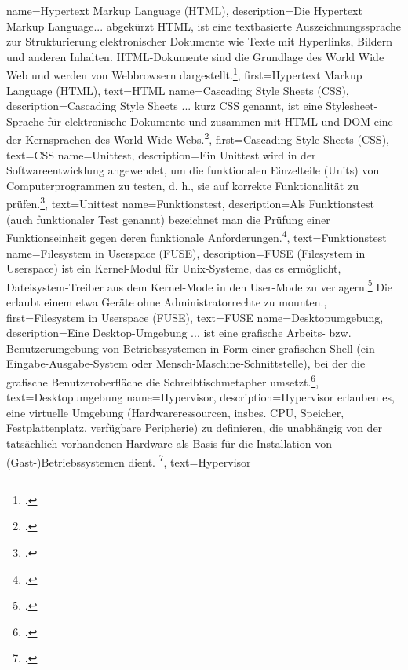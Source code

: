 {
    name={Hypertext Markup Language (HTML)},
    description={Die Hypertext Markup Language... abgekürzt HTML, ist eine textbasierte
      Auszeichnungssprache zur Strukturierung elektronischer Dokumente wie Texte mit
      Hyperlinks, Bildern und anderen Inhalten. HTML-Dokumente sind die Grundlage des
      World Wide Web und werden von Webbrowsern dargestellt.\footcite{html}},
    first={Hypertext Markup Language (HTML)},
    text={HTML}
}
{
    name={Cascading Style Sheets (CSS)},
    description={Cascading Style Sheets ... kurz CSS genannt, ist
      eine Stylesheet-Sprache für elektronische Dokumente und zusammen mit HTML und
      DOM eine der Kernsprachen des World Wide Webs.\footcite{css}},
    first={Cascading Style Sheets (CSS)},
    text={CSS}
}
{
    name={Unittest},
    description={Ein Unittest wird in der Softwareentwicklung angewendet, um
      die funktionalen Einzelteile (Units) von Computerprogrammen zu testen, d. h.,
      sie auf korrekte Funktionalität zu prüfen.\footcite{unittest}},
    text={Unittest}
}
{
    name={Funktionstest},
    description={Als Funktionstest (auch funktionaler Test genannt) bezeichnet
      man die Prüfung einer Funktionseinheit gegen deren funktionale
      Anforderungen.\footcite{funktionstest}},
    text={Funktionstest}
}
{
    name={Filesystem in Userspace (FUSE)},
    description={FUSE (Filesystem in Userspace) ist ein Kernel-Modul für
      Unix-Systeme, das es ermöglicht, Dateisystem-Treiber aus dem Kernel-Mode in den
      User-Mode zu verlagern.\footcite{fuse} Die erlaubt einem etwa Geräte ohne
      Administratorrechte zu mounten.},
    first={Filesystem in Userspace (FUSE)},
    text={FUSE}
}
{
    name={Desktopumgebung},
    description={Eine Desktop-Umgebung ... ist eine grafische Arbeits- bzw.
      Benutzerumgebung von Betriebssystemen in Form einer grafischen Shell (ein
      Eingabe-Ausgabe-System oder Mensch-Maschine-Schnittstelle), bei der die
      grafische Benutzeroberfläche die Schreibtischmetapher
      umsetzt.\footcite{desktopumgebung}},
    text={Desktopumgebung}
}
{
    name={Hypervisor},
    description={Hypervisor erlauben es, eine virtuelle Umgebung
      (Hardwareressourcen, insbes. CPU, Speicher, Festplattenplatz, verfügbare
      Peripherie) zu definieren, die unabhängig von der tatsächlich vorhandenen
      Hardware als Basis für die Installation von (Gast-)Betriebssystemen
      dient. \footcite{hypervisor}},
    text={Hypervisor}
}
